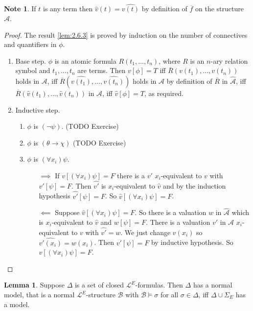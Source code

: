 \documentclass{article}
\newcommand{\A}{\mathcal{A}}
\renewcommand{\L}{\mathcal{L}}
\newcommand{\rb}[1]{\left( #1 \right)}
\renewcommand{\sb}[1]{\left[ #1 \right]}
\newcommand{\notb}[1]{\rb{\neg #1}}
\newcommand{\impb}[2]{\rb{#1 \rightarrow #2}}
\newcommand{\fab}[1]{\rb{\forall #1}}
\theoremstyle{definition}\newtheorem{definition}{Definition}[subsection]
\theoremstyle{definition}\newtheorem{remark}[definition]{Remark}
\theoremstyle{definition}\newtheorem*{example}{Example}
\theoremstyle{definition}\newtheorem*{note}{Note}
\newtheorem{lemma}[definition]{Lemma}
\begin{document}
\begin{note}
If $ t $ is any term then $ \widehat{v}\rb{t} = \widehat{v\rb{t}} $ by definition of $ \overline{f} $ on the structure $ \widehat{\A} $.
\end{note}

\begin{proof}
The result \ref{lem:2.6.3} is proved by induction on the number of connectives and quantifiers in $ \phi $.
\begin{enumerate}
\item Base step. $ \phi $ is an atomic formula $ R\rb{t_1, \dots, t_n} $, where $ R $ is an $ n $-ary relation symbol and $ t_1, \dots, t_n $ are terms. Then $ v\sb{\phi} = T $ iff $ \overline{R}\rb{v\rb{t_1}, \dots, v\rb{t_n}} $ holds in $ \A $, iff $ \overline{R}\rb{\widehat{v\rb{t_1}}, \dots, \widehat{v\rb{t_n}}} $ holds in $ \A $ by definition of $ \overline{R} $ in $ \widehat{\A} $, iff $ \overline{R}\rb{\widehat{v}\rb{t_1}, \dots, \widehat{v}\rb{t_n}} $ in $ \A $, iff $ \widehat{v}\sb{\phi} = T $, as required.
\item Inductive step.
\begin{enumerate}
\item $ \phi $ is $ \notb{\psi} $. (TODO Exercise)
\item $ \phi $ is $ \impb{\theta}{\chi} $ (TODO Exercise)
\item $ \phi $ is $ \fab{x_i}\psi $.
\begin{itemize}
\item[$ \implies $] If $ v\sb{\fab{x_i}\psi} = F $ there is a $ v' $ $ x_i $-equivalent to $ v $ with $ v'\sb{\psi} = F $. Then $ \widehat{v'} $ is $ x_i $-equivalent to $ \widehat{v} $ and by the induction hypothesis $ \widehat{v'}\sb{\psi} = F $. So $ \widehat{v}\sb{\fab{x_i}\psi} = F $.
\item[$ \impliedby $] Suppose $ \widehat{v}\sb{\fab{x_i}\psi} = F $. So there is a valuation $ w $ in $ \widehat{\A} $ which is $ x_i $-equivalent to $ \widehat{v} $ and $ w\sb{\psi} = F $. There is a valuation $ v' $ in $ \A $ $ x_i $-equivalent to $ v $ with $ \widehat{v'} = w $. We just change $ v\rb{x_i} $ so $ \widehat{v'\rb{x_i}} = w\rb{x_i} $. Then $ v'\sb{\psi} = F $ by inductive hypothesis. So $ v\sb{\fab{x_i}\psi} = F $.
\end{itemize}
\end{enumerate}
\end{enumerate}
\end{proof}

\begin{lemma}
\label{lem:2.6.4}
Suppose $ \Delta $ is a set of closed $ \L^E $-formulas. Then $ \Delta $ has a normal model, that is a normal $ \L^E $-structure $ \mathcal{B} $ with $ \mathcal{B} \vDash \sigma $ for all $ \sigma \in \Delta $, iff $ \Delta \cup \Sigma_E $ has a model.
\end{lemma}
\end{document}
